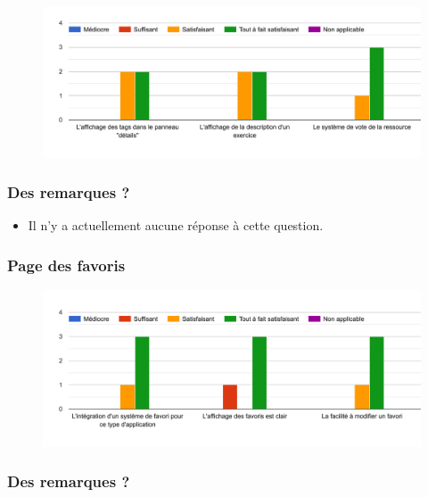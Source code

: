 \begin{figure}[H]
    \includegraphics[width=\textwidth,height=0.3\textheight,keepaspectratio]{images/googleForm/resinfo_1.png}
    \centering
\end{figure}

\subsubsection*{Des remarques ?}

\begin{itemize}
    \item Il n'y a actuellement aucune réponse à cette question.
\end{itemize}

\subsubsection*{Page des favoris}

\begin{figure}[H]
    \includegraphics[width=\textwidth,height=0.3\textheight,keepaspectratio]{images/googleForm/favoris_1.png}
    \centering
\end{figure}

\subsubsection*{Des remarques ?}

